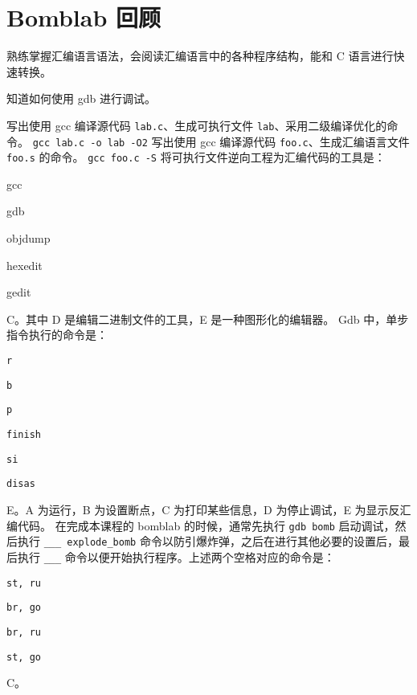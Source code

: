 \chapter{Bomblab 回顾}
    \begin{summary}
        \begin{compactitem}
            \item 熟练掌握汇编语言语法，会阅读汇编语言中的各种程序结构，能和 C 语言进行快速转换。
            \item 知道如何使用 gdb 进行调试。
        \end{compactitem}
    \end{summary}

    \begin{problems}
        \pro 写出使用 gcc 编译源代码 \verb|lab.c|、生成可执行文件 \verb|lab|、采用二级编译优化的命令。
        \sol \verb|gcc lab.c -o lab -O2|
        \pro 写出使用 gcc 编译源代码 \verb|foo.c|、生成汇编语言文件 \verb|foo.s| 的命令。
        \sol \verb|gcc foo.c -S|
        \pro 将可执行文件逆向工程为汇编代码的工具是：
        \begin{choices}
            \item gcc
            \item gdb
            \item objdump
            \item hexedit
            \item gedit
        \end{choices}
        \sol C。其中 D 是编辑二进制文件的工具，E 是一种图形化的编辑器。
        \pro Gdb 中，单步指令执行的命令是：
        \begin{choices}
            \item \verb|r|
            \item \verb|b|
            \item \verb|p|
            \item \verb|finish|
            \item \verb|si|
            \item \verb|disas|
        \end{choices}
        \sol E。A 为运行，B 为设置断点，C 为打印某些信息，D 为停止调试，E 为显示反汇编代码。
         在完成本课程的 bomblab 的时候，通常先执行 \verb|gdb bomb| 启动调试，然后执行 \verb|___ explode_bomb| 命令以防引爆炸弹，之后在进行其他必要的设置后，最后执行 \verb|___| 命令以便开始执行程序。上述两个空格对应的命令是：
        \begin{choices}
            \item \verb|st, ru|
            \item \verb|br, go|
            \item \verb|br, ru|
            \item \verb|st, go|
        \end{choices}
        \sol C。
    \end{problems}